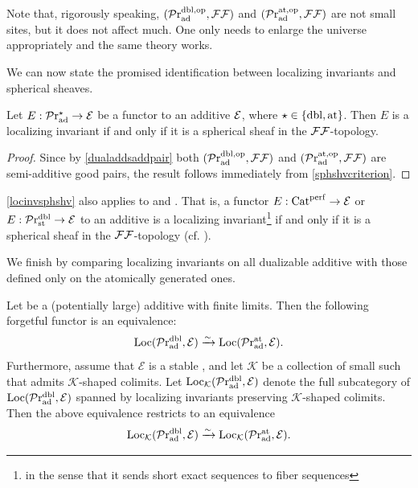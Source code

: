 \documentclass[a4paper,10pt, oneside]{amsart}
\begin{document}
	\begin{rem}
		Note that, rigorously speaking, $(\mathcal{P}\mathrm{r}_{\mathrm{ad}}^{\mathrm{dbl,op}},\mathcal{F}\mathcal{F})$ and $(\mathcal{P}\mathrm{r}_{\mathrm{ad}}^{\mathrm{at,op}},\mathcal{F}\mathcal{F})$ are not small sites, but it does not affect much. One only needs to enlarge the universe appropriately and the same theory works.
	\end{rem}
	We can now state the promised identification between localizing invariants and spherical sheaves.
	\begin{thm}\label{locinvsphshv}
		Let $E: \mathcal{P}\mathrm{r}_{\mathrm{ad}}^\star \to \mathcal{E}$ be a functor to an additive \infcat $\mathcal{E}$, where $\star \in \{ \mathrm{dbl}, \mathrm{at} \}$. Then $E$ is a localizing invariant if and only if it is a spherical sheaf in the $\mathcal{F}\mathcal{F}$-topology.
	\end{thm}
	\begin{proof}
		Since by \cref{dualaddsaddpair} both $(\mathcal{P}\mathrm{r}_{\mathrm{ad}}^{\mathrm{dbl,op}},\mathcal{F}\mathcal{F})$ and $(\mathcal{P}\mathrm{r}_{\mathrm{ad}}^{\mathrm{at,op}},\mathcal{F}\mathcal{F})$ are semi-additive good pairs, the result follows immediately from \cref{sphshvcriterion}.
	\end{proof}
	\begin{rem}
		\cref{locinvsphshv} also applies to \catper and \prstdbl. That is, a functor $E:\mathrm{Cat}^{\mathrm{perf}}\to \mathcal{E}$ or $E:\mathcal{P}\mathrm{r}_{\mathrm{st}}^{\mathrm{dbl}}\to \mathcal{E}$ to an additive \infcat \mce is a localizing invariant\footnote{in the sense that it sends short exact sequences to fiber sequences} if and only if it is a spherical sheaf in the $\mathcal{F}\mathcal{F}$-topology (cf. \cite[Proposition 4.17]{efimov2024k}).
	\end{rem}
	We finish by comparing localizing invariants on all dualizable additive \infcats with those defined only on the atomically generated ones.
	\begin{thm}\label{smalllargelocinv}
		Let \mce be a (potentially large) additive \infcat with finite limits. Then the following forgetful functor is an equivalence:
		$$\mathrm{Loc}(\mathcal{P}\mathrm{r}_{\mathrm{ad}}^{\mathrm{dbl}},\mathcal{E})\xrightarrow{\sim} \mathrm{Loc}(\mathcal{P}\mathrm{r}_{\mathrm{ad}}^{\mathrm{at}},\mathcal{E}).$$
		Furthermore, assume that $\mathcal{E}$ is a stable \infcat, and let $\mathcal{K}$ be a collection of small \infcats such that \mce admits $\mathcal{K}$-shaped colimits. Let $\operatorname{Loc}_{\mathcal{K}}(\mathcal{P}\mathrm{r}_{\mathrm{ad}}^{\mathrm{dbl}},\mathcal{E})$ denote the full subcategory of $\operatorname{Loc}(\mathcal{P}\mathrm{r}_{\mathrm{ad}}^{\mathrm{dbl}},\mathcal{E})$ spanned by localizing invariants preserving $\mathcal{K}$-shaped colimits. Then the above equivalence restricts to an equivalence $$\operatorname{Loc}_{\mathcal{K}}(\mathcal{P}\mathrm{r}_{\mathrm{ad}}^{\mathrm{dbl}},\mathcal{E}) \xrightarrow{\sim} \operatorname{Loc}_{\mathcal{K}}(\mathcal{P}\mathrm{r}_{\mathrm{ad}}^{\mathrm{at}}, \mathcal{E}).$$
	\end{thm}
\end{document}
